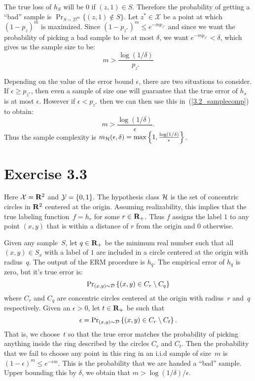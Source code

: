 The true loss of $h_S$ will be $0$ if $(z, 1) \in S$. Therefore the probability 
of getting a ``bad'' sample is $\Pr_{S \sim \mathcal{D}^m}\{(z, 1) \notin S\}$.
Let $z^{*} \in \mathcal{X}$ be a point at which $(1 - p_z)^m$ is maximized. Since 
$(1 - p_{z^{*}})^m \leq e^{- m p_{z^{*}}}$ and since we want the probability of 
picking a bad sample to be at most $\delta$, we want $e^{- m p_{z^{*}}} < \delta$,
which gives us the sample size to be:
\begin{equation}
\label{3.2_samplecomp}
	m  > \frac{\log (1 / \delta)}{p_{z^{*}}}
\end{equation}

Depending on the value of the error bound $\epsilon$, there are two situations
to consider. If $\epsilon \geq p_{z^{*}}$, then even a sample of size one will
guarantee that the true error of $h_s$ is at most $\epsilon$. However if 
$\epsilon < p_{z^{*}}$ then we can then use this in~(\ref{3.2_samplecomp})
to obtain: 
\[
    m > \frac{\log (1 / \delta)}{\epsilon}.
\]
Thus the sample complexity is $m_{\mathcal{H}}(\epsilon, \delta) = 
\max \left \{1, \frac{\log (1 / \delta)}{\epsilon} \right \}$.

\section*{Exercise 3.3}

Here $\mathcal{X} = \mathbf{R}^2$ and $\mathcal{Y} = \{0, 1\}$. The hypothesis class $\mathcal{H}$
is the set of concentric circles in $\mathbf{R}^2$ centered at the origin. Assuming
realizability, this implies that the true labeling function~$f = h_r$ for some
$r \in \mathbf{R}_{+}$. Thus $f$ assigns the label $1$ to any point $(x, y) $ that is
within a distance of $r$ from the origin and $0$ otherwise. 

Given any sample~$S$, let $q \in \mathbf{R}_{+}$ be the minimum real number such that
all $(x, y) \in S_x$ with a label of $1$ are included in a circle centered at
the origin with radius~$q$. The output of the ERM procedure is $h_q$. The
empirical error of $h_q$ is zero, but it's true error is:
\[
	\text{Pr}_{(x, y) \sim \mathcal{D}} \left \{ (x, y) \in C_r \setminus C_q \right \}
\]
where $C_r$ and $C_q$ are concentric circles centered at the origin with
radius~$r$ and~$q$ respectively. Given an $\epsilon > 0$, let $t \in \mathbf{R}_{+}$ be
such that $$\epsilon = \text{Pr}_{(x, y) \sim \mathcal{D}} \left \{ (x, y) \in C_r \setminus
C_t \right \}.$$ That is, we choose~$t$ so that the true error matches the probability
of picking anything inside the ring described by the circles $C_r$ and $C_t$.
Then the probability that we fail to choose any point in this ring in an i.i.d
sample of size~$m$ is $(1 - \epsilon)^m \leq e^{- \epsilon m}$. This is the
probability that we are handed a ``bad'' sample. Upper bounding this by
$\delta$, we obtain that $m > \log(1 / \delta) / \epsilon$.


